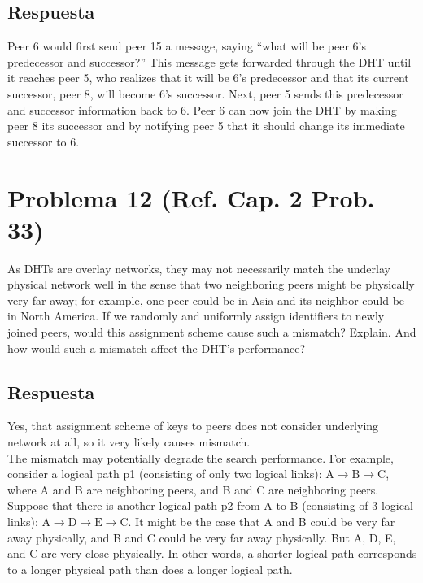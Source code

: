 \documentclass[10pt,spanish]{article}
\numberwithin{figure}{section} %
\begin{document}
\subsection*{Respuesta}

Peer 6 would first send peer 15 a message, saying ``what will be peer 6’s predecessor and successor?'' This message gets forwarded through the DHT until it reaches peer 5, who realizes that it will be 6’s predecessor and that its current successor, peer 8, will become 6’s successor. Next, peer 5 sends this predecessor and successor information back to 6. Peer 6 can now join the DHT by making peer 8 its successor and by notifying peer 5 that it should change its immediate successor to 6.

\section[Problema 12]{Problema 12 \textnormal{\Large{(Ref. Cap. 2 Prob. 33)}}}

As DHTs are overlay networks, they may not necessarily match the underlay physical network well in the sense that two neighboring peers might be physically very far away; for example, one peer could be in Asia and its neighbor could be in North America. If we randomly and uniformly assign identifiers to newly joined peers, would this assignment scheme cause such a mismatch? Explain. And how would such a mismatch affect the DHT’s performance?

\subsection*{Respuesta}

Yes, that assignment scheme of keys to peers does not consider underlying network at all, so it very likely causes mismatch.\\
The mismatch may potentially degrade the search performance. For example, consider a logical path p1 (consisting of only two logical links): $\mathrm{A \rightarrow B \rightarrow C}$, where A and B are neighboring peers, and B and C are neighboring peers. Suppose that there is another logical path p2 from A to B (consisting of 3 logical links): $\mathrm{A \rightarrow D \rightarrow E \rightarrow C}$.
It might be the case that A and B could be very far away physically, and B and C could be very far away physically. But A, D, E, and C are very close physically. In other words, a shorter logical path corresponds to a longer physical path than does a longer logical path.
\end{document}

